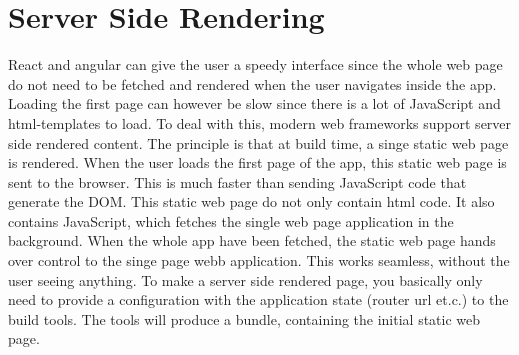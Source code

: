 \chapter{Server Side Rendering} \label{chapter:server:side:rendering}
React and angular can give the user a speedy interface since the whole web page do not need to be fetched and rendered when the user navigates inside the app. Loading the first page can however be slow since there is a lot of JavaScript and html-templates to load. To deal with this, modern web frameworks support server side rendered content. The principle is that at build time, a singe static web page is rendered. When the user loads the first page of the app, this static web page is sent to the browser. This is much faster than sending  JavaScript code that generate the DOM. This static web page do not only contain html code. It also contains JavaScript, which fetches the single web page application in the background. When the whole app have been fetched, the static web page hands over control to the singe page webb application. This works seamless, without the user seeing anything.
 To make a server side rendered page, you basically only need to provide a configuration with the application state (router url et.c.) to the build tools. The tools will produce a bundle, containing the initial static web page.

